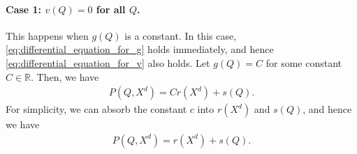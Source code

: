 \documentclass[11pt, a4paper]{article}
\theoremstyle{remark}
\begin{document}
\paragraph{Case 1: $v(Q) = 0$ for all $Q$.}
This happens when $g(Q)$ is a constant.
In this case, \eqref{eq:differential_equation_for_g} holds immediately, and hence \eqref{eq:differential_equation_for_v} also holds.
Let $g(Q) = C$ for some constant $C \in \mathbb{R}$.
Then, we have
\begin{align}
    P(Q, X^{d}) = Cr(X^{d}) + s(Q).
\end{align}
For simplicity, we can absorb the constant $c$ into $r(X^{d})$ and $s(Q)$, and hence we have
\begin{align}
    P(Q, X^{d}) = r(X^{d}) + s(Q). \label{eq:inverse_demand_separable_step2_constant}
\end{align}
\end{document}
